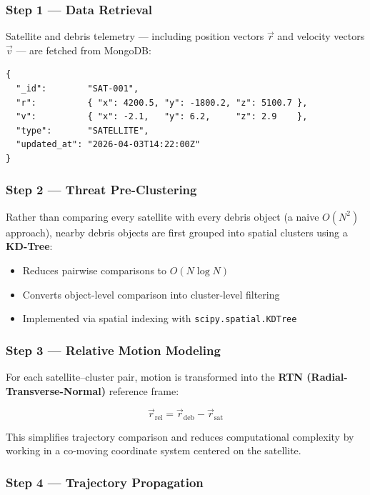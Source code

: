 \documentclass[11pt, a4paper]{article}
\newcommand{\keyword}[1]{\textcolor{orbitcyan}{\textbf{#1}}}
\newcommand{\tech}[1]{\texttt{\textcolor{headingblue}{#1}}}
\begin{document}
\subsubsection{Step 1 --- Data Retrieval}

Satellite and debris telemetry --- including position vectors $\vec{r}$ and velocity vectors
$\vec{v}$ --- are fetched from MongoDB:

\begin{lstlisting}[style=jsonstyle, caption={Satellite State Vector from MongoDB}]
{
  "_id":        "SAT-001",
  "r":          { "x": 4200.5, "y": -1800.2, "z": 5100.7 },
  "v":          { "x": -2.1,   "y": 6.2,     "z": 2.9    },
  "type":       "SATELLITE",
  "updated_at": "2026-04-03T14:22:00Z"
}
\end{lstlisting}

\subsubsection{Step 2 --- Threat Pre-Clustering}

Rather than comparing every satellite with every debris object (a naive $O(N^2)$ approach),
nearby debris objects are first grouped into spatial clusters using a \keyword{KD-Tree}:

\begin{itemize}[leftmargin=1.5cm]
  \item Reduces pairwise comparisons to $O(N \log N)$
  \item Converts object-level comparison into cluster-level filtering
  \item Implemented via spatial indexing with \tech{scipy.spatial.KDTree}
\end{itemize}

\subsubsection{Step 3 --- Relative Motion Modeling}

For each satellite--cluster pair, motion is transformed into the \keyword{RTN (Radial-Transverse-Normal)} reference frame:

\[
  \vec{r}_{\text{rel}} = \vec{r}_{\text{deb}} - \vec{r}_{\text{sat}}
\]

This simplifies trajectory comparison and reduces computational complexity by working in a
co-moving coordinate system centered on the satellite.

\subsubsection{Step 4 --- Trajectory Propagation}
\end{document}
